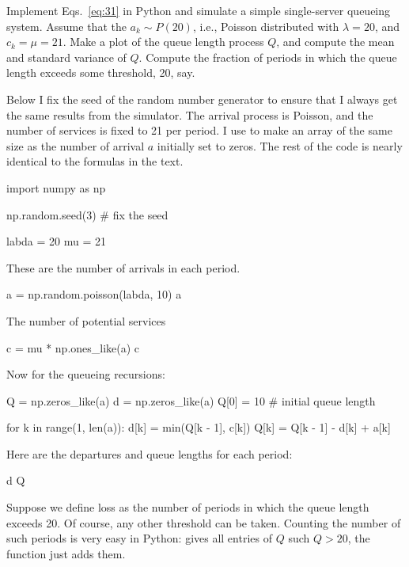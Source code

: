 \begin{exercise}
  Implement Eqs.~\ref{eq:31} in Python and simulate a
  simple single-server queueing system. Assume that the $a_k \sim P(20)$, i.e., Poisson distributed with $\lambda=20$, and $c_k =\mu=21$. Make a plot of the queue length process $Q$, and compute the mean and standard variance of $Q$. Compute the fraction of periods in which the queue length exceeds some threshold, 20, say. 
  \begin{solution}
    Below I fix the seed of the random number generator to ensure that
    I always get the same results from the simulator.  The arrival
    process is Poisson, and the number of services is fixed to 21 per
    period. I use  to make an array of the
    same size as the number of arrival $a$ initially set to zeros. The
    rest of the code is nearly identical to the formulas in the text.

\begin{pyconsole}
import numpy as np

np.random.seed(3) # fix the seed

labda = 20
mu = 21
\end{pyconsole}

These are the number of arrivals in each period.

\begin{pyconsole}
a = np.random.poisson(labda, 10)
a
\end{pyconsole}

The number of potential services
\begin{pyconsole}
c = mu * np.ones_like(a)
c
\end{pyconsole}

Now for the queueing recursions:

\begin{pyconsole}
Q = np.zeros_like(a)
d = np.zeros_like(a)
Q[0] = 10  # initial queue length

for k in range(1, len(a)):
    d[k] = min(Q[k - 1], c[k])
    Q[k] = Q[k - 1] - d[k] + a[k]

\end{pyconsole}

Here are the departures and queue lengths for each period:
\begin{pyconsole}
d
Q
\end{pyconsole}


Suppose we define loss as the number of periods in which the queue length exceeds
20. Of course, any other threshold can be taken. Counting the number
of such periods is very easy in Python:  gives all
entries of $Q$ such $Q>20$, the function  just adds
them. 


\end{solution}
\end{exercise}
